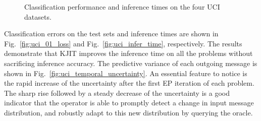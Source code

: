 \documentclass[english]{article}
\theoremstyle{plain}
\theoremstyle{plain}
\newcommand{\figref}[1]{Fig.~\ref{#1}}
\begin{document}
\begin{figure}[ht]
  \centering
  \caption{Classification performance and inference times on the four UCI datasets. 
   }
  \label{fig:uci_performance}
\end{figure}


Classification errors on the test sets and inference times are shown in 
\figref{fig:uci_01_loss} and \figref{fig:uci_infer_time}, respectively.
The results demonstrate that KJIT improves the inference time on all the 
problems without sacrificing inference accuracy. The  predictive 
variance of each outgoing message is shown in 
\figref{fig:uci_temporal_uncertainty}. An essential feature to notice is the 
rapid increase of the uncertainty after the first EP iteration of each problem. 
The sharp rise followed by a steady decrease of the uncertainty is a good indicator 
that the operator is able to promptly detect a change in input message distribution,
and robustly adapt to this new distribution by querying the oracle.
\end{document}
